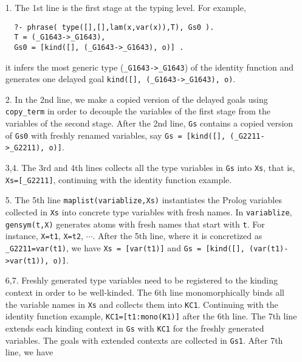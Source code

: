 \documentclass[runningheads,a4paper]{llncs}
\begin{document}
\begin{itemize}
\item[1.]
The 1st line is the first stage at the typing level.
For example, {\small \vspace*{-1.1ex}
\begin{verbatim}
  ?- phrase( type([],[],lam(x,var(x)),T), Gs0 ).
  T = (_G1643->_G1643),
  Gs0 = [kind([], (_G1643->_G1643), o)] .
\end{verbatim} \vspace*{-1.1ex} }
it infers the most generic type ({\small\verb|_G1643->_G1643|})
of the identity function and generates one delayed goal
{\;\small\verb|kind([], (_G1643->_G1643), o)|}.
\item[2.]
In the 2nd line, we make a copied version of
the delayed goals using {\small\verb|copy_term|} in order to decouple
the variables of the first stage from the variables of the second stage.
After the 2nd line, {\small\verb|Gs|} contains a copied version of
{\small\verb|Gs0|} with freshly renamed variables, say
{\small\verb|Gs = [kind([], (_G2211->_G2211), o)]|}.
\item[3,4.]
The 3rd and 4th lines collects all the type variables
in {\small\verb|Gs|} into {\small\verb|Xs|}, that is,
{\small\verb|Xs=[_G2211]|}, continuing with the identity function example.
\item[5.]
The 5th line {\small\verb|maplist(variablize,Xs)|} instantiates
the Prolog variables collected in {\small\verb|Xs|} into concrete
type variables with fresh names. In {\small\verb|variablize|},
{\small\verb|gensym(t,X)|} generates atoms with fresh names that start with
{\small\verb|t|}. For instance, {\small\verb|X=t1|}, {\small\verb|X=t2|},
$\cdots$. After the 5th line, where it is concretized as
{\small\verb|_G2211=var(t1)|}, we have {\small\verb|Xs = [var(t1)]|} and
{\small\verb|Gs = [kind([], (var(t1)->var(t1)), o)]|}.
\item[6,7.] Freshly generated type variables need to be
registered to the kinding context in order to be well-kinded.
The 6th line monomorphically binds 
all the variable names in {\small\verb|Xs|} and collects them
into {\small\verb|KC1|}. Continuing with the identity function example,
{\small\verb|KC1=[t1:mono(K1)]|} after the 6th line. The 7th line
extends each kinding context in {\small\verb|Gs|} with {\small\verb|KC1|}
for the freshly generated variables. The goals with extended contexts are
collected in {\small\verb|Gs1|}. After 7th line, we have 

\end{itemize}
\end{document}
